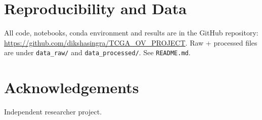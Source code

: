 \documentclass[11pt]{article}
\begin{document}
\section{Reproducibility and Data}
All code, notebooks, conda environment and results are in the GitHub repository: \url{https://github.com/dikshasingra/TCGA_OV_PROJECT}. Raw + processed files are under \texttt{data\_raw/} and \texttt{data\_processed/}. See \texttt{README.md}.

\section{Acknowledgements}
Independent researcher project.



\end{document}
